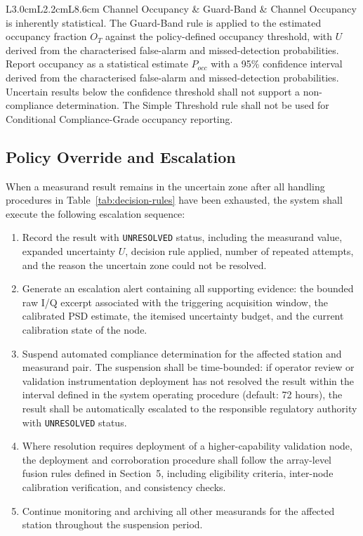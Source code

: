 \documentclass[11pt]{article}
\begin{document}
\begin{longtable}{L{3.0cm}L{2.2cm}L{8.6cm}}
Channel Occupancy & Guard-Band &
Channel Occupancy is inherently statistical. The Guard-Band rule is applied to the estimated occupancy fraction $O_T$ against the policy-defined occupancy threshold, with $U$ derived from the characterised false-alarm and missed-detection probabilities. Report occupancy as a statistical estimate $P_{occ}$ with a 95\% confidence interval derived from the characterised false-alarm and missed-detection probabilities. Uncertain results below the confidence threshold shall not support a non-compliance determination. The Simple Threshold rule shall not be used for Conditional Compliance-Grade occupancy reporting. \\

\end{longtable}

\subsection*{Policy Override and Escalation}

When a measurand result remains in the uncertain zone after all handling procedures in Table~\ref{tab:decision-rules} have been exhausted, the system shall execute the following escalation sequence:

\begin{enumerate}
    \item Record the result with \texttt{UNRESOLVED} status, including the measurand value, expanded uncertainty $U$, decision rule applied, number of repeated attempts, and the reason the uncertain zone could not be resolved.
    \item Generate an escalation alert containing all supporting evidence: the bounded raw I/Q excerpt associated with the triggering acquisition window, the calibrated PSD estimate, the itemised uncertainty budget, and the current calibration state of the node.
    \item Suspend automated compliance determination for the affected station and measurand pair. The suspension shall be time-bounded: if operator review or validation instrumentation deployment has not resolved the result within the interval defined in the system operating procedure (default: 72 hours), the result shall be automatically escalated to the responsible regulatory authority with \texttt{UNRESOLVED} status.
    \item Where resolution requires deployment of a higher-capability validation node, the deployment and corroboration procedure shall follow the array-level fusion rules defined in Section~5, including eligibility criteria, inter-node calibration verification, and consistency checks.
    \item Continue monitoring and archiving all other measurands for the affected station throughout the suspension period.
\end{enumerate}
\end{document}
